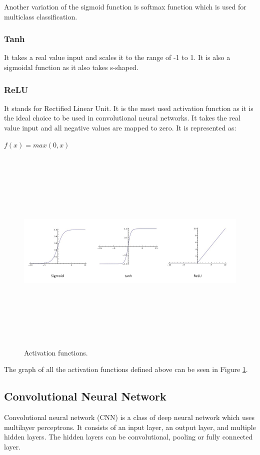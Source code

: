 Another variation of the sigmoid function is softmax function which is used for multiclass classification.

\subsubsection{Tanh}
It takes a real value input and scales it to the range of -1 to 1. It is also a sigmoidal function as it also takes s-shaped.


\subsubsection{ReLU}
It stands for Rectified Linear Unit. It is the most used activation function as it is the ideal choice to be used in convolutional neural networks. It takes the real value input and all negative values are mapped to zero. It is represented as:

\begin{center}
	$f(x) = max(0, x)$
\end{center}

\begin{figure}[htpb]
	\centering
	\includegraphics[width=15cm,height=10cm,keepaspectratio=true]{images/act-funcs}
	\caption{
		Activation functions\cite{ujjwalkarn}.
	}
	\label{fig:funcs}
\end{figure}

The graph of all the activation functions defined above can be seen in Figure \ref{fig:funcs}.

\subsection{Convolutional Neural Network}
Convolutional neural network (CNN) is a class of deep neural network which uses multilayer perceptrons. It consists of an input layer, an output layer, and multiple hidden layers. The hidden layers can be convolutional, pooling or fully connected layer.

